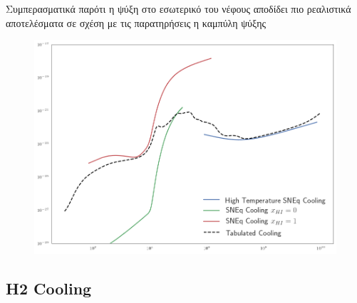 Συμπερασματικά παρότι η ψύξη στο εσωτερικό του νέφους αποδίδει πιο ρεαλιστικά αποτελέσματα σε σχέση με τις παρατηρήσεις η καμπύλη ψύξης  
\begin{figure}
	\centering
	\includegraphics[width=1\linewidth]{DataImages/SNEQcooling-function}
	\caption{}
	\label{fig:sneqcooling-function}
\end{figure}



%	



\newpage
	\subsection{H2 Cooling}
	
